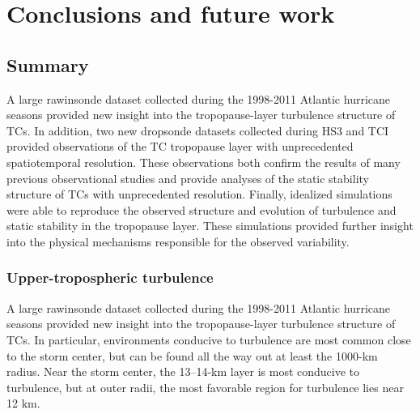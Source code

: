  
\chapter{Conclusions and future work}
\label{chapter:conclusions}
\resetfootnote %

\section{Summary}

A large rawinsonde dataset collected during the 1998-2011 Atlantic hurricane seasons provided new insight into the tropopause-layer turbulence structure of TCs.
In addition, two new dropsonde datasets collected during HS3 and TCI provided observations of the TC tropopause layer with unprecedented spatiotemporal resolution.
These observations both confirm the results of many previous observational studies and provide analyses of the static stability structure of TCs with unprecedented resolution.
Finally, idealized simulations were able to reproduce the observed structure and evolution of turbulence and static stability in the tropopause layer.
These simulations provided further insight into the physical mechanisms responsible for the observed variability.

\subsection{Upper-tropospheric turbulence}
A large rawinsonde dataset collected during the 1998-2011 Atlantic hurricane seasons provided new insight into the tropopause-layer turbulence structure of TCs.
In particular, environments conducive to turbulence are most common close to the storm center, but can be found all the way out at least the 1000-km radius.
Near the storm center, the 13--14-km layer is most conducive to turbulence, but at outer radii, the most favorable region for turbulence lies near 12 km.

